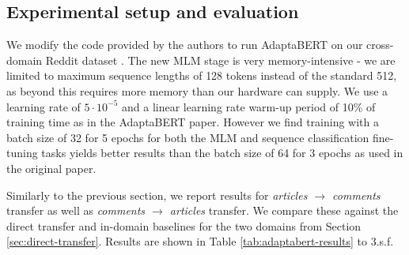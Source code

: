 \subsection{Experimental setup and evaluation} \label{subsec:adaptabert-evaluation}

We modify the code provided by the authors to run AdaptaBERT on our cross-domain Reddit dataset \cite{adaptabert-code}. The new MLM stage is very memory-intensive - we are limited to maximum sequence lengths of 128 tokens instead of the standard 512, as beyond this requires more memory than our hardware can supply. We use a learning rate of $ 5 \cdot 10^{-5} $ and a linear learning rate warm-up period of 10\% of training time as in the AdaptaBERT paper. However we find training with a batch size of 32 for 5 epochs for both the MLM and sequence classification fine-tuning tasks yields better results than the batch size of 64 for 3 epochs as used in the original paper.

Similarly to the previous section, we report results for \textit{articles $ \rightarrow $ comments} transfer as well as \textit{comments $ \rightarrow $ articles} transfer. We compare these against the direct transfer and in-domain baselines for the two domains from Section \ref{sec:direct-transfer}. Results are shown in Table \ref{tab:adaptabert-results} to 3.s.f.

